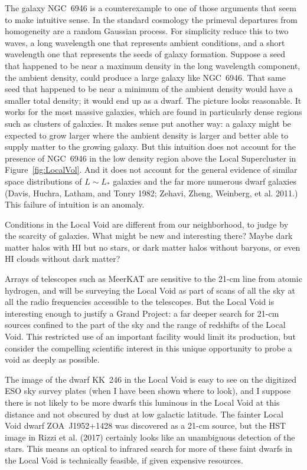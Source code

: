 \documentclass[fleqn,usenatbib]{mnras}
\begin{document}
The galaxy NGC~6946 is a counterexample to one of those arguments that seem to make intuitive sense. In the standard cosmology the primeval departures from homogeneity are a random Gaussian process. For simplicity reduce this to two waves, a long wavelength one that represents ambient conditions, and a short wavelength one that represents the seeds of galaxy formation. Suppose a seed that happened to be near a maximum density in the long wavelength component, the ambient density, could produce a large galaxy like NGC~6946. That same seed that happened to be near a minimum of the ambient density would have a smaller total density; it would end up as a dwarf. The picture looks reasonable. It works for the most massive galaxies, which are found in particularly dense regions such as clusters of galaxies. It makes sense put another way: a galaxy might be expected to grow larger where the ambient density is larger and better able to supply matter to the growing galaxy. But this intuition does not account for the presence of NGC~6946 in the low density region above the Local Supercluster in Figure~\ref{fig:LocalVol}. And it does not account for the general evidence of similar space distributions of $L\sim L_\ast$ galaxies and the far more numerous dwarf galaxies (Davis, Huchra, Latham, and Tonry 1982;  Zehavi, Zheng, Weinberg, et al. 2011.) This failure of intuition is an anomaly.  

Conditions in the Local Void are different from our neighborhood, to judge by the scarcity of galaxies. What might be new and interesting there? Maybe dark matter halos with HI but no stars, or dark matter halos without baryons, or even HI clouds without dark matter? 

Arrays of telescopes such as MeerKAT are sensitive to the 21-cm line from atomic hydrogen, and  will be surveying the Local Void as part of scans of all the sky at all the radio frequencies accessible to the telescopes. But the Local Void is interesting enough to justify a Grand Project: a far deeper search for 21-cm sources confined to the part of the sky and the range of redshifts of the Local Void. This restricted use of an important facility would limit its production, but consider the compelling scientific interest in this unique opportunity to probe a void as deeply as possible. 

The image of the dwarf KK~246 in the Local Void is easy to see on the digitized ESO sky survey  plates (when I have been shown where to look), and I suppose there is not likely to be more dwarfs this luminous in the Local Void at this distance and not obscured by dust at low galactic latitude. The fainter Local Void dwarf ZOA~J1952+1428 was discovered as a 21-cm source, but the HST image in Rizzi et al. (2017) certainly looks like an unambiguous detection of the stars. This means an optical to infrared search for more of these faint dwarfs in the Local Void is technically feasible, if given expensive resources. 
\end{document}
